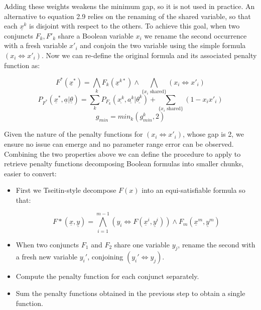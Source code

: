 Adding these weights weakens the minimum gap, so it is not used in practice. An alternative to equation 2.9 relies on the renaming of the shared variable, so that each $\underline{x}^k$ is disjoint with respect to the others. To achieve this goal, when two conjuncts $F_k, F'_k$ share a Boolean variable $x_i$ we rename the second occurrence with a fresh variable $x'_i$ and conjoin the two variable using the simple formula $(x_i \iff x'_i)$. Now we can re-define the original formula and its associated penalty function as:

\begin{equation*}
    F^*(\underline{x}^*) = \bigwedge_k F_k(\underline{x}^{k*}) \land \bigwedge_{\{ x_i \textrm{  shared}\}} (x_i \iff x'_i) 
\end{equation*}
\begin{equation}
    P_{F^*}(\underline{x}^*,\underline{a}|\underline{\theta}) = \sum_k P_{F_k}(\underline{x^k},\underline{a^k}|\underline{\theta^k}) + \sum_{\{ x_i \textrm{  shared}\}} (1 - x_ix'_i)
\end{equation}
\begin{equation*}
    g_{min} = min_k(g^k_{min},2)
\end{equation*}

Given the nature of the penalty functions for $(x_i \iff x'_i)$, whose gap is 2, we ensure no issue can emerge and no parameter range error can be observed.
Combining the two properties above we can define the procedure to apply to retrieve penalty functions decomposing Boolean formulas into smaller chunks, easier to convert:

\begin{itemize}
    \item First we Tseitin-style decompose $F(x)$ into an equi-satisfiable formula so that:
    
    \begin{equation}
        F*(\underline{x},\underline{y}) = \bigwedge^{m-1}_{i=1} 
        (y_i \iff F(\underline{x}^i,\underline{y}^i)) \wedge F_m(\underline{x}^m,\underline{y}^m)
    \end{equation}
    
    \item When two conjuncts $F_1$ and $F_2$ share one variable $y_j$, rename the second with a fresh new variable $y_i'$, conjoining $(y_i' \iff y_j)$.
    \item Compute the penalty function for each conjunct separately.
    \item Sum the penalty functions obtained in the previous step to obtain a single function. 
\end{itemize}

